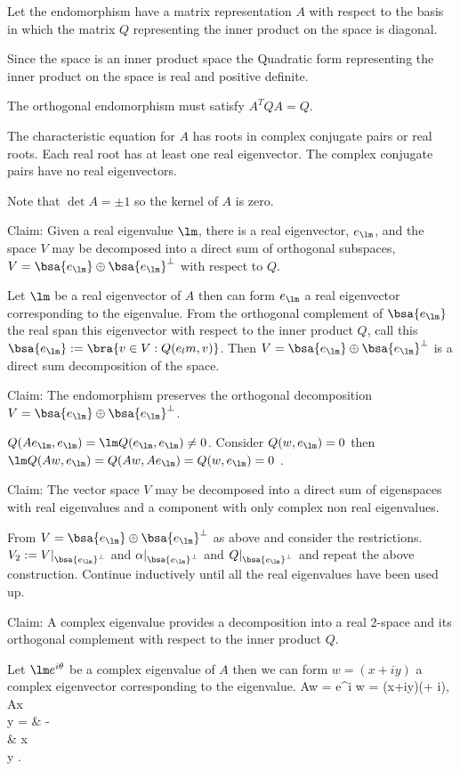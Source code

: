 \begin{solution}[\bf Solution.]
Let the endomorphism have a matrix representation $A$ with respect to the basis in which the matrix $Q$ representing the inner product on the space is diagonal.

Since the space is an inner product space the Quadratic form representing the inner product on the space is real and positive definite.

The orthogonal endomorphism must satisfy $A^TQA = Q$.

The characteristic equation for $A$ has roots in complex conjugate pairs or real roots. Each real root has at least one real eigenvector. The complex conjugate pairs have no real eigenvectors.

Note that $\det A = \pm 1$ so the kernel of $A$ is zero.

Claim: Given a real eigenvalue $\lm$, there is a real eigenvector, $e_\lm$, and the space $V$ may be decomposed into a direct sum of orthogonal subspaces, $V= \bsa{e_\lm} \oplus \bsa{e_\lm}^\perp$ with respect to $Q$.

Let $\lm$ be a real eigenvector of $A$ then can form $e_\lm$ a real eigenvector corresponding to the eigenvalue. From the orthogonal complement of $\bsa{e_\lm}$ the real span this eigenvector with respect to the inner product $Q$, call this $\bsa{e_\lm} := \bra{v\in V:Q(e_lm,v)}$. Then $V=\bsa{e_\lm}\oplus \bsa{e_\lm}^\perp$ is a direct sum decomposition of the space.

Claim: The endomorphism preserves the orthogonal decomposition $V = \bsa{e_\lm}\oplus \bsa{e_\lm}^\perp$.

$Q(Ae_\lm,e_\lm) = \lm Q(e_\lm,e_\lm) \neq 0$. Consider $Q(w,e_\lm) =0$ then $\lm Q(Aw,e_\lm) = Q(Aw,Ae_\lm) = Q(w,e_\lm) = 0$ .

Claim: The vector space $V$ may be decomposed into a direct sum of eigenspaces with real eigenvalues and a component with only complex non real eigenvalues.

From $V = \bsa{e_\lm} \oplus \bsa{e_\lm}^\perp$ as above and consider the restrictions. $V_2 := V|_{\bsa{e_\lm}^\perp}$ and $\alpha|_{\bsa{e_\lm}^\perp}$ and $Q|_{\bsa{e_\lm}^\perp}$ and repeat the above construction. Continue inductively until all the real eigenvalues have been used up.

Claim: A complex eigenvalue provides a decomposition into a real 2-space and its orthogonal complement with respect to the inner product $Q$.

Let $\lm e^{i\theta}$ be a complex eigenvalue of $A$ then we can form $w = (x+iy)$ a complex eigenvector corresponding to the eigenvalue.
\be
Aw = \lm e^{i\theta} w = (x+iy)\lm (\cos\theta + i\sin \theta), \quad\quad A\bepm x\\ y \eepm = \bepm \cos\theta & -\sin \theta \\ \sin \theta & \cos\theta \eepm \bepm x\\ y \eepm.
\ee


\end{solution}
